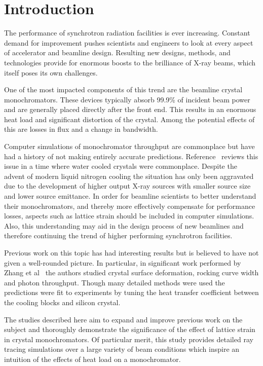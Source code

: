 \documentclass{iucr}
\begin{document}
\section{Introduction}

The performance of synchrotron radiation facilities is ever increasing. Constant demand for improvement pushes scientists and engineers to look at every aspect of accelerator and beamline design. Resulting new designs, methods, and technologies provide for enormous boosts to the brilliance of X-ray beams, which itself poses its own challenges.

One of the most impacted components of this trend are the beamline crystal monochromators. These devices typically absorb 99.9\% of incident beam power~\cite{willmott} and are generally placed directly after the front end. This results in an enormous heat load and significant distortion of the crystal. Among the potential effects of this are losses in flux and a change in bandwidth.

Computer simulations of monochromator throughput are commonplace but have had a history of not making entirely accurate predictions. Reference~\cite{innacuratepredictions} reviews this issue in a time where water cooled crystals were commonplace. Despite the advent of modern liquid nitrogen cooling the situation has only been aggravated due to the development of higher output X-ray sources with smaller source size and lower source emittance. In order for beamline scientists to better understand their monochromators, and thereby more effectively compensate for performance losses, aspects such as lattice strain should be included in computer simulations. Also, this understanding may aid in the design process of new beamlines and therefore continuing the trend of higher performing synchrotron facilities.

Previous work on this topic has had interesting results but is believed to have not given a well-rounded picture. In particular, in significant work performed by Zhang et al~\cite{Zhang} the authors studied crystal surface deformation, rocking curve width and photon throughput. Though many detailed methods were used the predictions were fit to experiments by tuning the heat transfer coefficient between the cooling blocks and silicon crystal.

The studies described here aim to expand and improve previous work on the subject and thoroughly demonstrate the significance of the effect of lattice strain in crystal monochromators. Of particular merit, this study provides detailed ray tracing simulations over a large variety of beam conditions which inspire an intuition of the effects of heat load on a monochromator.
\end{document}
